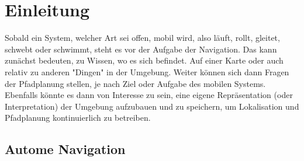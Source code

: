 %
\chapter{Einleitung}


Sobald ein System, welcher Art sei offen, mobil wird, also läuft, rollt, gleitet, schwebt oder schwimmt, steht es vor der Aufgabe der Navigation. Das kann zunächst bedeuten, zu Wissen, wo es sich befindet. Auf einer Karte oder auch relativ zu anderen "Dingen"  in der Umgebung. Weiter können sich dann Fragen der Pfadplanung stellen, je nach Ziel oder Aufgabe des mobilen Systems. Ebenfalls könnte es dann von Interesse zu sein, eine eigene Repräsentation (oder Interpretation) der Umgebung aufzubauen und zu speichern, um Lokalisation und Pfadplanung kontinuierlich zu betreiben. 

\section{Autome Navigation}



